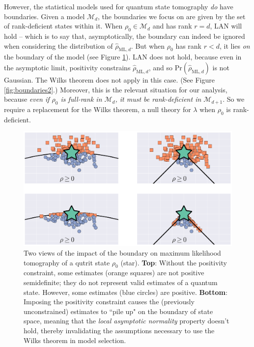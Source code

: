 \documentclass[aps,pra, twocolumn]{revtex4-1}
\newcommand{\M}{\mathcal{M}}
\newcommand{\rhohat}{\hat{\rho}}
\newcommand{\rhoML}[1]{\rhohat_{\scriptscriptstyle{\mathrm{ML},#1}}}
\begin{document}
However, the statistical models used for quantum state tomography \emph{do} have boundaries. Given a model $\M_{d}$, the boundaries we focus on are given by the set of rank-deficient states within it. When $\rho_{0}\in \M_{d}$ and has rank $r = d$, LAN will hold -- which is to say that, asymptotically, the boundary can indeed be ignored when considering the distribution of $\rhoML{d}$. But when $\rho_{0}$ has rank $r<d$, it lies \emph{on} the boundary of the model (see Figure \ref{fig:boundaries}).  LAN does not hold, because even in the asymptotic limit, positivity constrains $\rhoML{d}$, and so $\mathrm{Pr}(\rhoML{d})$ is not Gaussian.  The Wilks theorem does not apply in this case.  (See Figure \ref{fig:boundaries2}.) Moreover, this is the relevant situation for our analysis, because \emph{even if $\rho_{0}$ is full-rank in $\M_{d}$, it must be rank-deficient in $\M_{d+1}$}.  So we require a replacement for the Wilks theorem, a null theory for $\lambda$ when $\rho_0$ is rank-deficient. 

\begin{figure}[h]
\includegraphics[width=\columnwidth]{Images/Figure_1.pdf}
 \caption{Two views of the impact of the boundary on maximum likelihood tomography of a qutrit state $\rho_{0}$ (star). \textbf{Top}: Without the positivity constraint, some estimates (orange squares) are not positive semidefinite; they do not represent valid estimates of a quantum state. However, some estimates (blue circles) are positive.
\textbf{Bottom}:  Imposing the positivity constraint causes the (previously unconstrained) estimates to ``pile up" on the boundary of state space, meaning that the \emph{local asymptotic normality} property doesn't hold, thereby invalidating the assumptions necessary to use the Wilks theorem in model selection.}
\label{fig:boundaries}
\end{figure}
\end{document}
